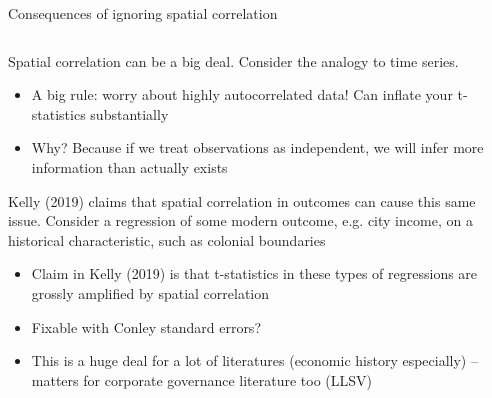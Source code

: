 \documentclass[notes,11pt, aspectratio=169]{beamer}
\newenvironment{wideitemize}{\itemize\addtolength{\itemsep}{10pt}}{\enditemize}
\begin{document}
\begin{frame}{Consequences of ignoring spatial correlation}
\begin{columns}[T] %
\begin{column}{.8\textwidth}
  \begin{wideitemize}
  \item Spatial correlation can be a big deal. Consider the analogy to time series.
    \begin{itemize}
    \item A big rule: worry about highly autocorrelated data! Can inflate your t-statistics substantially
    \item Why? Because if we treat observations as independent, we
      will infer more information than actually exists
    \end{itemize}
  \item Kelly (2019) claims that spatial correlation in outcomes can
    cause this same issue. Consider a regression of some modern
    outcome, e.g. city income, on a historical characteristic, such as
    colonial boundaries
    \begin{itemize}
    \item Claim in Kelly (2019) is that t-statistics in these types of regressions are grossly amplified by spatial correlation
    \item Fixable with Conley standard errors?
    \item This is a huge deal for a lot of literatures (economic
      history especially) -- matters for corporate governance
      literature too (LLSV)
    \end{itemize}
  \end{wideitemize}
  \end{column}
  \hfill%
  \begin{column}{.3\textwidth}
  \end{column}
  \end{columns}
\end{frame}
\end{document}

